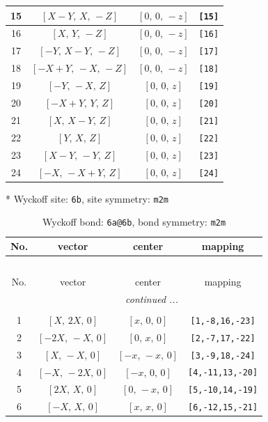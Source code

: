 \documentclass[fleqn,8pt]{jsarticle}
\begin{document}
\begin{longtable}{cccc}
15 & $\left[ X - Y,\, X,\, - Z \right]$ & $\left[ 0,\, 0,\, - z \right]$ & {\tt [15]} \\ \hline
16 & $\left[ X,\, Y,\, - Z \right]$ & $\left[ 0,\, 0,\, - z \right]$ & {\tt [16]} \\ \hline
17 & $\left[ - Y,\, X - Y,\, - Z \right]$ & $\left[ 0,\, 0,\, - z \right]$ & {\tt [17]} \\ \hline
18 & $\left[ - X + Y,\, - X,\, - Z \right]$ & $\left[ 0,\, 0,\, - z \right]$ & {\tt [18]} \\ \hline
19 & $\left[ - Y,\, - X,\, Z \right]$ & $\left[ 0,\, 0,\, z \right]$ & {\tt [19]} \\ \hline
20 & $\left[ - X + Y,\, Y,\, Z \right]$ & $\left[ 0,\, 0,\, z \right]$ & {\tt [20]} \\ \hline
21 & $\left[ X,\, X - Y,\, Z \right]$ & $\left[ 0,\, 0,\, z \right]$ & {\tt [21]} \\ \hline
22 & $\left[ Y,\, X,\, Z \right]$ & $\left[ 0,\, 0,\, z \right]$ & {\tt [22]} \\ \hline
23 & $\left[ X - Y,\, - Y,\, Z \right]$ & $\left[ 0,\, 0,\, z \right]$ & {\tt [23]} \\ \hline
24 & $\left[ - X,\, - X + Y,\, Z \right]$ & $\left[ 0,\, 0,\, z \right]$ & {\tt [24]} \\
\end{longtable}
* Wyckoff site: {\tt 6b}, site symmetry: {\tt m2m}
\renewcommand{\arraystretch}{1.2}
\begin{longtable}{cccc}
\caption{Wyckoff bond: {\tt 6a@6b}, bond symmetry: {\tt m2m}}
 \\
 \hline \hline
No. & vector & center & mapping \\ \hline \endfirsthead

\multicolumn{3}{l}{\tablename\ \thetable{}} \\
 \hline \hline
No. & vector & center & mapping \\ \hline \endhead

 \hline \hline
\multicolumn{3}{r}{\footnotesize\it continued ...} \\ \endfoot

 \hline \hline
\multicolumn{3}{r}{} \\ \endlastfoot

1 & $\left[ X,\, 2 X,\, 0 \right]$ & $\left[ x,\, 0,\, 0 \right]$ & {\tt [1,-8,16,-23]} \\ \hline
2 & $\left[ - 2 X,\, - X,\, 0 \right]$ & $\left[ 0,\, x,\, 0 \right]$ & {\tt [2,-7,17,-22]} \\ \hline
3 & $\left[ X,\, - X,\, 0 \right]$ & $\left[ - x,\, - x,\, 0 \right]$ & {\tt [3,-9,18,-24]} \\ \hline
4 & $\left[ - X,\, - 2 X,\, 0 \right]$ & $\left[ - x,\, 0,\, 0 \right]$ & {\tt [4,-11,13,-20]} \\ \hline
5 & $\left[ 2 X,\, X,\, 0 \right]$ & $\left[ 0,\, - x,\, 0 \right]$ & {\tt [5,-10,14,-19]} \\ \hline
6 & $\left[ - X,\, X,\, 0 \right]$ & $\left[ x,\, x,\, 0 \right]$ & {\tt [6,-12,15,-21]} \\
\end{longtable}
\end{document}
